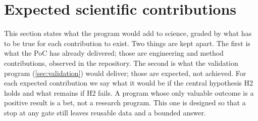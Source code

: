 \section{Expected scientific contributions}
\label{sec:contributions}

This section states what the program would add to science, graded by what has to be true for each
contribution to exist. Two things are kept apart. The first is what the PoC has already delivered;
those are engineering and method contributions, observed in the repository. The second is what the
validation program (\cref{sec:validation}) would deliver; those are expected, not achieved. For each
expected contribution we say what it would be if the central hypothesis H2 holds and what remains if
H2 fails. A program whose only valuable outcome is a positive result is a bet, not a research
program. This one is designed so that a stop at any gate still leaves reusable data and a bounded
answer.

